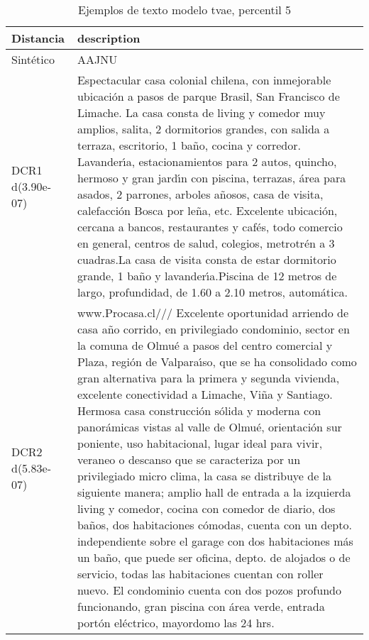 \begin{table}[H]
\centering
\fontsize{10}{14}\selectfont
\caption{Ejemplos de texto modelo tvae, percentil 5}
\label{table-example-economicos-a-2-tvae-5p-text}
\begin{tabular}{|l|m{35em}|}
\hline
\rowcolor[gray]{0.8}
Distancia & description \\
\hline Sintético & AAJNU \\
\hline DCR1 d(3.90e-07) & Espectacular casa colonial chilena, con inmejorable ubicaci\'on a pasos de parque Brasil, San Francisco de Limache. La casa consta de living y comedor muy amplios, salita, 2 dormitorios grandes, con salida a terraza, escritorio, 1 ba\~no, cocina y corredor. Lavander{\'\i}a, estacionamientos para 2 autos, quincho, hermoso y gran jard{\'\i}n con piscina, terrazas, \'area para asados, 2 parrones, arboles a\~nosos, casa de visita, calefacci\'on Bosca por le\~na, etc. Excelente ubicaci\'on, cercana a bancos, restaurantes y caf\'es, todo comercio en general, centros de salud, colegios, metrotr\'en a 3 cuadras.La casa de visita consta de estar dormitorio grande, 1 ba\~no y lavander{\'\i}a.Piscina de 12 metros de largo, profundidad, de 1.60 a 2.10 metros, autom\'atica. \\
\hline DCR2 d(5.83e-07) & www.Procasa.cl///    Excelente oportunidad arriendo de casa a\~no corrido, en privilegiado condominio, sector en la comuna de Olmu\'e a pasos del centro comercial y Plaza, regi\'on de Valpara{\'\i}so, que se ha consolidado como gran alternativa para la primera y segunda vivienda, excelente conectividad a Limache, Vi\~na y Santiago.    Hermosa casa construcci\'on s\'olida y moderna con panor\'amicas vistas al valle de Olmu\'e, orientaci\'on sur poniente, uso habitacional,  lugar ideal para vivir, veraneo o descanso que se caracteriza por un privilegiado micro clima, la casa se distribuye de la siguiente manera; amplio hall de entrada a la izquierda living y comedor, cocina con comedor de diario, dos ba\~nos,  dos habitaciones c\'omodas, cuenta con un depto. independiente sobre el garage con dos habitaciones m\'as un ba\~no, que puede ser oficina, depto. de alojados o de  servicio, todas las habitaciones cuentan con roller nuevo.     El condominio cuenta con dos pozos profundo funcionando, gran piscina con \'area verde, entrada port\'on el\'ectrico, mayordomo las 24 hrs. \\
\hline
\end{tabular}
\end{table}

